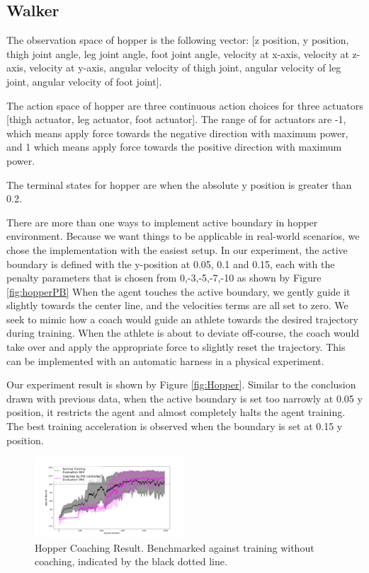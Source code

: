 \documentclass[journal]{IEEEtran}
\begin{document}
\subsection{Walker}
The observation space of hopper is the following vector: [z position, y position, thigh joint angle, leg joint angle, foot joint angle, velocity at x-axis, velocity at z-axis, velocity at y-axis, angular velocity of thigh joint, angular velocity of leg joint, angular velocity of foot joint].

The action space of hopper are three continuous action choices for three actuators [thigh actuator, leg actuator, foot actuator]. The range of for actuators are -1, which means apply force towards the negative direction with maximum power, and 1 which means apply force towards the positive direction with maximum power.

The terminal states for hopper are when the absolute y position is greater than 0.2.

There are more than one ways to implement active boundary in hopper environment. Because we want things to be applicable in real-world scenarios, we chose the implementation with the easiest setup. In our experiment, the active boundary is defined with the y-position at 0.05, 0.1 and 0.15, each with the penalty parameters that is chosen from 0,-3,-5,-7,-10 as shown by Figure \ref{fig:hopperPB} When the agent touches the active boundary, we gently guide it slightly towards the center line, and the velocities terms are all set to zero. We seek to mimic how a coach would guide an athlete towards the desired trajectory during training. When the athlete is about to deviate off-course, the coach would take over and apply the appropriate force to slightly reset the trajectory. This can be implemented with an automatic harness in a physical experiment.

Our experiment result is shown by Figure \ref{fig:Hopper}. Similar to the conclusion drawn with previous data, when the active boundary is set too narrowly at 0.05 y position, it restricts the agent and almost completely halts the agent training. The best training acceleration is observed when the boundary is set at 0.15 y position.

\begin{figure}
     \centering
      \includegraphics[width=0.5\textwidth]{walker.png}
      \caption{Hopper Coaching Result. Benchmarked against training without coaching, indicated by the black dotted line.}
      \label{fig:hopper}
\end{figure}
\end{document}

